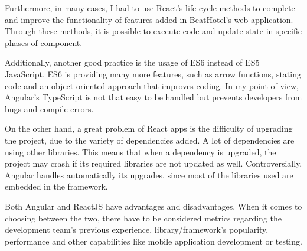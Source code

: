 Furthermore, in many cases, I had to use React's life-cycle methods to complete and improve the functionality of features added in BeatHotel's web application. Through these methods, it is possible to execute code and update state in specific phases of component.\par

Additionally, another good practice is the usage of ES6 instead of ES5 JavaScript. ES6 is providing many more features, such as arrow functions, stating code and an object-oriented approach that improves coding. In my point of view, Angular's TypeScript is not that easy to be handled but prevents developers from bugs and compile-errors. \par

On the other hand, a great problem of React apps is the difficulty of upgrading the project, due to the variety of dependencies added. A lot of dependencies are using other libraries. This means that when a dependency is upgraded, the project may crash if its required libraries are not updated as well. Controversially, Angular handles automatically its upgrades, since most of the libraries used are embedded in the framework. \par

Both Angular and ReactJS have advantages and disadvantages. When it comes to choosing between the two, there have to be considered metrics regarding the development team’s previous experience, library/framework's popularity, performance and other capabilities like mobile application development or testing. \par
